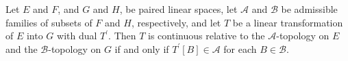 Let $E$ and $F$, and $G$ and $H$, be paired linear spaces, let $\mathcal{A}$ and $\mathcal{B}$ be admissible families of subsets of $F$ and $H$, respectively, and let $T$ be a linear transformation of $E$ into $G$ with dual $T^{\prime}$. Then $T$ is continuous relative to the $\mathcal{A}$-topology on $E$ and the $\mathcal{B}$-topology on $G$ if and only if $T^{\prime}[B] \in \mathcal{A}$ for each $B \in \mathcal{B}$.
